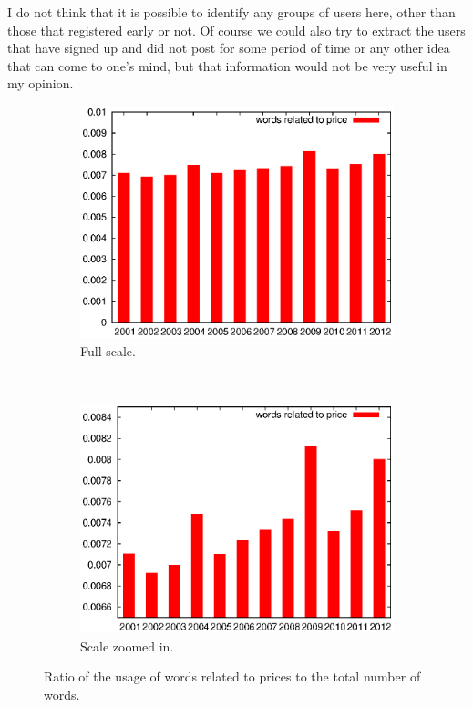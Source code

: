     I do not think that it is possible to identify any groups of users here, other than those that registered early or not. Of course we could also try to extract the users that have signed up and did not post for some period of time or any other idea that can come to one's mind, but that information would not be very useful in my opinion.
    \begin{figure}[H]
      \centering
      \begin{subfigure}[H]{0.7\textwidth}
        \includegraphics[width=\textwidth]{chapters/03_implementation/yearly_price1}
        \caption{Full scale.}
        \label{fig:dist_price_year_1}
      \end{subfigure}
      \\
      \begin{subfigure}[H]{0.7\textwidth}
        \includegraphics[width=\textwidth]{chapters/03_implementation/yearly_price2}
        \caption{Scale zoomed in.}
        \label{fig:dist_price_year_2}
      \end{subfigure}
      \caption{Ratio of the usage of words related to prices to the total number of words.}
      \label{fig:dist_price_year}
    \end{figure}
    
